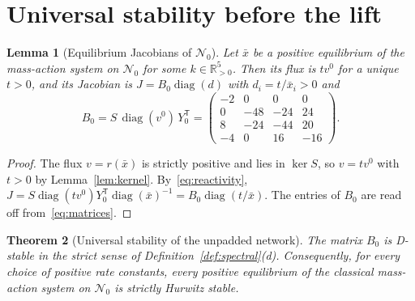 \documentclass[11pt,a4paper]{article}
\theoremstyle{plain}
\newtheorem{theorem}{Theorem}[section]
\newtheorem{lemma}[theorem]{Lemma}
\theoremstyle{definition}
\theoremstyle{remark}
\newcommand{\R}{\mathbb{R}}
\newcommand{\diag}{\operatorname{diag}}
\newcommand{\xbar}{\bar{x}}
\begin{document}
\section{Universal stability before the lift}\label{sec:stable}

\begin{lemma}[Equilibrium Jacobians of $\mathcal N_0$]\label{lem:template}
Let $\xbar$ be a positive equilibrium of the mass-action system on $\mathcal N_0$ for some $k\in\R^5_{>0}$. Then its flux is $tv^0$ for a unique $t>0$, and its Jacobian is $J=B_0\diag(d)$ with $d_i=t/\xbar_i>0$ and
\begin{equation}\label{eq:B0}
B_0=S\,\diag(v^0)\,Y_0^{\mathsf T}=\begin{pmatrix}-2&0&0&0\\0&-48&-24&24\\8&-24&-44&20\\-4&0&16&-16\end{pmatrix}.
\end{equation}
\end{lemma}

\begin{proof}
The flux $v=r(\xbar)$ is strictly positive and lies in $\ker S$, so $v=tv^0$ with $t>0$ by Lemma~\ref{lem:kernel}. By~\eqref{eq:reactivity}, $J=S\diag(tv^0)Y_0^{\mathsf T}\diag(\xbar)^{-1}=B_0\diag(t/\xbar)$. The entries of $B_0$ are read off from~\eqref{eq:matrices}.
\end{proof}

\begin{theorem}[Universal stability of the unpadded network]\label{thm:base-stable}
The matrix $B_0$ is D-stable in the strict sense of Definition~\ref{def:spectral}(d). Consequently, for every choice of positive rate constants, every positive equilibrium of the classical mass-action system on $\mathcal N_0$ is strictly Hurwitz stable.
\end{theorem}
\end{document}
